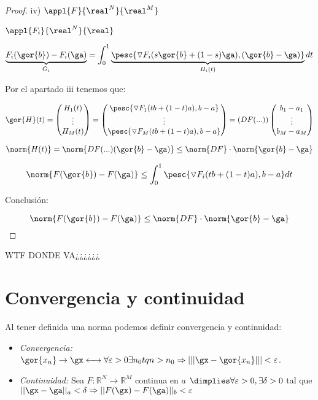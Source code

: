\documentclass[a4paper,10pt]{apuntes}
\begin{document}
\begin{itemize}
\begin{proof}
   iv) $\appl{F}{\real^N}{\real^M}$
   
   $\appl{F_i}{\real^N}{\real}$
   
   $\underbrace{F_i(\gor{b})-F_i(\ga)}_{G_i} = \displaystyle\int_0^1 \underbrace{\pesc{\triangledown F_i (s\gor{b}+(1-s)\ga ),(\gor{b}-\ga)}}_{H_i(t)}dt$
   
   Por el apartado iii tenemos que:
   
   
   $$\gor{H}(t) = \begin{pmatrix}
                   H_1(t)\\
                   \vdots\\
                   H_M(t)
                  \end{pmatrix}
                = \begin{pmatrix}
                   \pesc{\triangledown F_1(tb+(1-t)a),b-a}\\
                   \vdots\\
                   \pesc{\triangledown F_M(tb+(1-t)a),b-a}
                  \end{pmatrix}
		= \left(DF(...)\right)\begin{pmatrix}
		                        b_1-a_1\\
		                        \vdots\\
		                        b_M-a_M
		                       \end{pmatrix}
$$

$$\norm{H(t)} = \norm{DF(...)(\gor{b}-\ga)} \leq \norm{DF}\cdot\norm{\gor{b}-\ga}$$


$$\norm{F(\gor{b})-F(\ga)} \leq \displaystyle\int_0^1 \pesc{\triangledown F_i(tb+(1-t)a),b-a}dt$$
   
Conclusión:

$$\norm{F(\gor{b})-F(\ga)} \leq \norm{DF}\cdot\norm{\gor{b}-\ga}$$
  \end{proof}

\end{itemize}



\newpage
WTF DONDE VA¿¿¿¿¿¿
\section{Convergencia y continuidad}
Al tener definida una norma podemos definir convergencia y continuidad:
\begin{itemize}
 \item\emph{Convergencia:} $\gor{x_n} \rightarrow \gx \longleftrightarrow \forall \varepsilon > 0 \exists n_0 tq n>n_0 \Rightarrow |||\gx-\gor{x_n}|||<\varepsilon$.
 \item\emph{Continuidad:} Sea $F: \mathbb{R}^N \rightarrow \mathbb{R}^M$ continua en $a$ $\dimplies \forall \varepsilon > 0 , \exists \delta > 0$ tal que $||\gx-\ga||_a < \delta \Rightarrow ||F(\gx)-F(\ga)||_b< \varepsilon$
\end{itemize}
\end{document}
